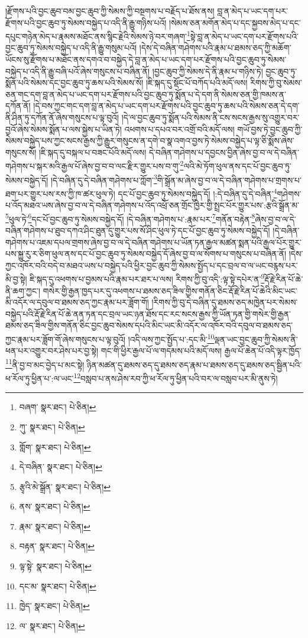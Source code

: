 །རྫོགས་པའི་བྱང་ཆུབ་བམ་བྱང་ཆུབ་ཀྱི་སེམས་ཀྱི་བསྔགས་པ་བརྗོད་པ་ཐོས་ནས། བླ་ན་མེད་པ་ཡང་དག་པར་རྫོགས་པའི་བྱང་ཆུབ་ཏུ་སེམས་བསྐྱེད་པ་འདི་ནི་རྒྱུ་གཉིས་པའོ། །སེམས་ཅན་མགོན་མེད་པ་དང་སྐྱབས་མེད་པ་དང་དཔུང་གཉེན་མེད་པ་རྣམས་མཐོང་ནས་སྙིང་རྗེའི་སེམས་ཉེ་བར་གཞག་\footnote{བཞག་  སྣར་ཐང་།  པེ་ཅིན། }སྟེ་བླ་ན་མེད་པ་ཡང་དག་པར་རྫོགས་པའི་བྱང་ཆུབ་ཏུ་སེམས་བསྐྱེད་པ་འདི་ནི་རྒྱུ་གསུམ་པའོ། །དེས་དེ་བཞིན་གཤེགས་པའི་རྣམ་པ་ཐམས་ཅད་ཀྱི་མཆོག་ཡོངས་སུ་རྫོགས་པ་མཐོང་ནས་དགའ་བ་བསྐྱེད་དེ་བླ་ན་མེད་པ་ཡང་དག་པར་རྫོགས་པའི་བྱང་ཆུབ་ཏུ་སེམས་བསྐྱེད་པ་འདི་ནི་རྒྱུ་བཞི་པའོ་ཞེས་གསུངས་པ་བཞིན་ནོ། །བྱང་ཆུབ་ཀྱི་སེམས་དེ་ནི་རྣམ་པ་གཉིས་ཏེ། བྱང་ཆུབ་ཏུ་སྨོན་པའི་སེམས་དང་བྱང་ཆུབ་ཏུ་ཆས་པའི་སེམས་སོ། །ཇི་སྐད་དུ་སྡོང་པོ་བཀོད་པའི་མདོ་ལས། རིགས་ཀྱི་བུ་སེམས་ཅན་གང་དག་བླ་ན་མེད་པ་ཡང་དག་པར་རྫོགས་པའི་བྱང་ཆུབ་ཏུ་སྨོན་པ་དེ་དག་ནི་སེམས་ཅན་གྱི་ཁམས་ན་དཀོན་ནོ། །དེ་བས་ཀྱང་གང་དག་བླ་ན་མེད་པ་ཡང་དག་པར་རྫོགས་པའི་བྱང་ཆུབ་ཏུ་ཆས་པའི་སེམས་ཅན་དེ་དག་ནི་ཤིན་ཏུ་དཀོན་ནོ་ཞེས་གསུངས་པ་ལྟ་བུའོ། །དེ་ལ་བྱང་ཆུབ་ཏུ་སྨོན་པའི་སེམས་ནི་ངས་སངས་རྒྱས་སུ་འགྱུར་བར་བྱའོ་ཞེས་སེམས་སྨོན་པ་ལས་སྐྱེས་པ་ཡིན་ཏེ། འཕགས་པ་དཔའ་བར་འགྲོ་བའི་མདོ་ལས། གཡོ་བྱས་ཏེ་བྱང་ཆུབ་ཀྱི་སེམས་བསྐྱེད་པས་ཀྱང་སངས་རྒྱས་ཀྱི་རྒྱུར་གསུངས་ན་དགེ་བ་སྣ་འགའ་བྱས་ཏེ་སེམས་བསྐྱེད་པ་ལྟ་ཅི་སྨོས་ཞེས་གསུངས་སོ། །ཇི་སྐད་དུ་བསྐལ་པ་བཟང་པོའི་མདོ་ལས། དེ་བཞིན་གཤེགས་པ་དབྱངས་བྱིན་ཞེས་བྱ་བ་ལ་དེ་བཞིན་གཤེགས་པ་སྐར་མའི་རྒྱལ་པོ་ཞེས་བྱ་བ་བ་ལང་རྫིར་གྱུར་པས་བ་གུ་\footnote{ཀུ་  སྣར་ཐང་།  པེ་ཅིན། }ལའི་མེ་ཏོག་ཕུལ་ནས་དང་པོ་བྱང་ཆུབ་ཏུ་སེམས་བསྐྱེད་དོ། །དེ་བཞིན་དུ་དེ་བཞིན་གཤེགས་པ་ཀློག་\footnote{གློག་  སྣར་ཐང་།  པེ་ཅིན། }གི་སྒྲོན་མ་ཞེས་བྱ་བ་ལ་དེ་བཞིན་གཤེགས་པ་གྲགས་པ་ཐག་པར་གྱུར་པས་རས་ཀྱི་ཁ་ཚར་ཕུལ་ཏེ། དང་པོ་བྱང་ཆུབ་ཏུ་སེམས་བསྐྱེད་དོ། །:དེ་བཞིན་དུ་དེ་བཞིན་\footnote{དེ་བཞིན་  སྣར་ཐང་།  པེ་ཅིན། }གཤེགས་པ་འོད་མཐའ་ཡས་ཞེས་བྱ་བ་ལ་དེ་བཞིན་གཤེགས་པ་འོད་འཕྲོ་ཅན་གྲོང་ཁྱེར་གྱི་སྤྲང་པོར་གྱུར་པས་:རྩའི་སྒྲོན་མ་\footnote{རྩྭའི་མེ་སྒྲོན་  སྣར་ཐང་།  པེ་ཅིན། }ཕུལ་ཏེ་\footnote{ནས་  སྣར་ཐང་།  པེ་ཅིན། }དང་པོ་བྱང་ཆུབ་ཏུ་སེམས་བསྐྱེད་དོ། །དེ་བཞིན་གཤེགས་པ་:རྣམ་པར་\footnote{རྣམ་  སྣར་ཐང་།  པེ་ཅིན། }གནོན་བརྟེན་\footnote{བརྟན་  སྣར་ཐང་།  པེ་ཅིན། }ཞེས་བྱ་བ་ལ་དེ་བཞིན་གཤེགས་པ་ཐུབ་དཀའ་ཤིང་ཐུན་དུ་གྱུར་པས་སོ་ཤིང་ཕུལ་ཏེ་དང་པོ་བྱང་ཆུབ་ཏུ་སེམས་བསྐྱེད་དོ། །དེ་བཞིན་གཤེགས་པ་འཇམ་དཔལ་གྲགས་ཞེས་བྱ་བ་ལ་དེ་བཞིན་གཤེགས་པ་ཡོན་ཏན་རྒྱལ་མཚན་སྨན་པའི་རྒྱལ་པོར་གྱུར་པས་སྐྱུ་རུ་ར་ཅིག་ཕུལ་ནས་དང་པོ་བྱང་ཆུབ་ཏུ་སེམས་བསྐྱེད་དོ་ཞེས་བྱ་བ་ལ་སོགས་པ་གསུངས་པ་བཞིན་ནོ། །དེས་ཀྱང་འཁོར་བའི་བདེ་བ་མཐའ་ཡས་པ་བསྐྱེད་པའི་ཕྱིར་བྱང་ཆུབ་ཀྱི་སེམས་སྤྱོད་པ་དང་བྲལ་བ་ལ་ཡང་བརྙས་པར་མི་བྱ་སྟེ། ཇི་སྐད་དུ་འཕགས་པ་བྱམས་པའི་རྣམ་པར་ཐར་པ་ལས། རིགས་ཀྱི་བུ་འདི་:ལྟ་སྟེ་དཔེར་ན་\footnote{ལྟ་སྟེ་  སྣར་ཐང་།  པེ་ཅིན། }རྡོ་རྗེ་རིན་པོ་ཆེ་ནི་ཆག་ཀྱང་། གསེར་གྱི་རྒྱན་ཁྱད་པར་དུ་འཕགས་པ་ཐམས་ཅད་ཟིལ་གྱིས་གནོན་ཅིང་རྡོ་རྗེ་རིན་པོ་ཆེའི་མིང་ཡང་མི་འདོར་ལ་དབུལ་བ་ཐམས་ཅད་ཀྱང་རྣམ་པར་ཟློག་གོ། །རིགས་ཀྱི་བུ་དེ་བཞིན་དུ་ཐམས་ཅད་མཁྱེན་པར་སེམས་བསྐྱེད་པའི་རྡོ་རྗེ་རིན་པོ་ཆེ་ནན་ཏན་དང་བྲལ་ཡང་ཉན་ཐོས་དང་རང་སངས་རྒྱས་ཀྱི་ཡོན་ཏན་གྱི་གསེར་གྱི་རྒྱན་ཐམས་ཅད་ཟིལ་གྱིས་གནོན་ཅིང་བྱང་ཆུབ་སེམས་དཔའི་མིང་ཡང་མི་འདོར་ལ་འཁོར་བའི་དབུལ་བ་ཐམས་ཅད་ཀྱང་རྣམ་པར་ཟློག་གོ་ཞེས་གསུངས་པ་ལྟ་བུའོ། །འདི་ལས་ཀྱང་སྤྱོད་པ་:དང་མི་\footnote{དང་མ་  སྣར་ཐང་།  པེ་ཅིན། }ལྡན་ཡང་བྱང་ཆུབ་ཀྱི་སེམས་ནི་ཕན་པར་འགྱུར་བར་ཤེས་པར་བྱ་སྟེ། གང་གི་ཕྱིར་རྒྱལ་པོ་ལ་གདམས་པའི་མདོ་ལས། རྒྱལ་པོ་ཆེན་པོ་འདི་ལྟར་ཁྱོད་\footnote{ཁྱེད་  སྣར་ཐང་།  པེ་ཅིན། }ནི་བྱ་བ་མང་བྱེད་པ་མང་སྟེ། ཉིན་མཚན་དུ་ཐམས་ཅད་དུ་ཐམས་ཅད་རྣམ་པ་ཐམས་ཅད་དུ་ཐམས་ཅད་སྦྱིན་པའི་ཕ་རོལ་ཏུ་ཕྱིན་པ་:ལ་ཡང་\footnote{ལ་  སྣར་ཐང་།  པེ་ཅིན། }བསླབ་པ་ནས་ཤེས་རབ་ཀྱི་ཕ་རོལ་ཏུ་ཕྱིན་པའི་བར་ལ་བསླབ་པར་མི་ནུས་ཏེ། 